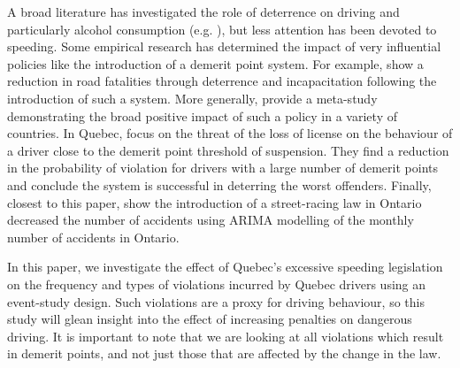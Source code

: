 A broad literature has investigated the role of deterrence on driving 
and particularly alcohol consumption 
(e.g. \citet{hansen2015}), 
but less attention has been devoted to speeding. 
Some empirical research has determined the impact of very influential policies 
like the introduction of a demerit point system. 
For example, 
\citet{bennedittiniNicita2009} 
show a reduction in road fatalities 
through deterrence and incapacitation following the introduction of such a system. 
More generally, 
\citet{castillocastro2012} 
provide a meta-study 
demonstrating the broad positive impact of such a policy in a variety of countries. 
In Quebec, 
\citet{dionneetal2011} 
focus on the threat of the loss of license 
on the behaviour of a driver close to the demerit point threshold of suspension. 
They find a reduction in the probability of violation for drivers 
with a large number of demerit points and conclude 
the system is successful in deterring the worst offenders. 
Finally, closest to this paper, 
\citet{meirambayeva2014} 
show the introduction of a street-racing law in Ontario decreased the number of accidents 
using ARIMA modelling of the monthly number of accidents in Ontario.
% 
%
% 


In this paper, we investigate the effect of Quebec’s excessive speeding legislation
 on the frequency and types of violations incurred by Quebec drivers 
using an event-study design. 
Such violations are a proxy for driving behaviour, 
so this study will glean insight into the effect of increasing penalties on dangerous driving. 
It is important to note that we are looking at all violations which result in demerit points, 
and not just those that are affected by the change in the law. 

